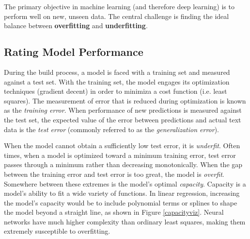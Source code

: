 The primary objective in machine learning (and therefore deep learning) is to perform well on new, unseen data.  The central challenge is finding the ideal balance between \textbf{overfitting} and \textbf{underfitting}.

\subsection{Rating Model Performance}


During the build process, a model is faced with a training set and measured against a test set.  With the training set, the model engages its optimization techniques (gradient decent) in order to minimiza a cost function (i.e. least squares).  The measurement of error that is reduced during optimization is known as the \textit{training error}.  When performance of new predictions is measured against the test set, the expected value of the error between predictions and actual text data is the \textit{test error} (commonly referred to as the \textit{generalization error}). \cite{Goodfellow-et-al-2016}

 When the model cannot obtain a sufficiently low test error, it is \textit{underfit}.  Often times, when a model is optimized toward a minimum training error, test error passes through a minimum rather than decreasing monotonically. \cite{mackay1992bayesian}  When the gap between the training error and test error is too great, the model is \textit{overfit}.  Somewhere between these extremes is the model's optimal \textit{capacity}.  Capacity is a model's ability to fit a wide variety of functions.  In linear regression, increasing the model's capacity would be to include polynomial terms or splines to shape the model beyond a straight line, as shown in Figure \ref{capacityviz}.  Neural networks have much higher complexity than ordinary least squares, making them extremely susceptible to overfitting.



